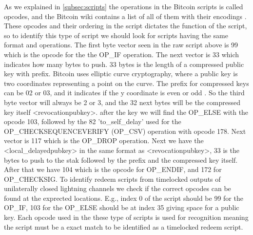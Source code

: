 As we explained in \cref{subsec:scripts} the operations in the Bitcoin scripts is called opcodes, and the Bitcoin wiki contains a list of all of them with their encodings \cite{bitcoin_wiki_scripts}. These opcodes and their ordering in the script dictates the function of the script, so to identify this type of script we should look for scripts having the same format and operations.
The first byte vector seen in the raw script above is 99 which is the opcode for the the OP\_IF operation. The next vector is 33 which indicates how many bytes to push. 33 bytes is the length of a compressed public key with prefix. Bitcoin uses elliptic curve cryptography, where a public key is two coordinates representing a point on the curve. The prefix for compressed keys can be 02 or 03, and it indicates if the y coordinate is even or odd \cite{antonopoulos2017mastering}. So the third byte vector will always be 2 or 3, and the 32 next bytes will be the compressed key itself <revocationpubkey>. after the key we will find the OP\_ELSE with the opcode 103, followed by the 82 'to\_self\_delay' used for the OP\_CHECKSEQUENCEVERIFY (OP\_CSV) operation with opcode 178. Next vector is 117 which is the OP\_DROP 
operation. Next we have the <local\_delayedpubkey> in the same format as <revocationpubkey>, 33 is the bytes to push to the stak followed by the prefix and the compressed key itself. After that we have 104 which is the opcode for OP\_ENDIF, and 172 for OP\_CHECKSIG.
To identify redeem scripts from timelocked outputs of unilaterally closed lightning channels we check if the correct opcodes can be found at the exprected locations. E.g., index 0 of the script should be 99 for the OP\_IF, 103 for the OP\_ELSE should be at index 35 giving space for a public key. Each opcode used in the these type of scripts is used for recognition meaning the script must be a exact match to be identified as a timelocked redeem script.
\\


